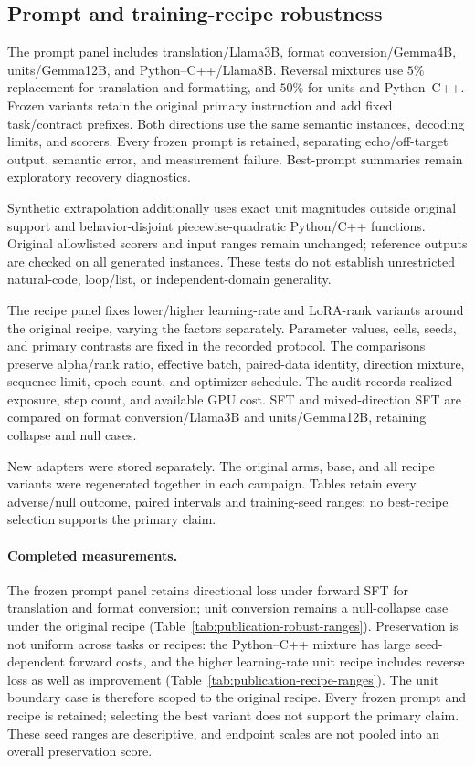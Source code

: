 \subsection{Prompt and training-recipe robustness}
\label{app:robustness}

The prompt panel includes translation/Llama3B, format conversion/Gemma4B, units/Gemma12B,
and Python--C++/Llama8B. Reversal mixtures use $5\%$ replacement for translation and
formatting, and $50\%$ for units and Python--C++. Frozen variants retain the original
primary instruction and add fixed task/contract prefixes. Both directions use the same semantic instances, decoding limits,
and scorers. Every frozen prompt is retained, separating echo/off-target output, semantic error,
and measurement failure. Best-prompt summaries remain exploratory recovery diagnostics.

Synthetic extrapolation additionally uses exact unit magnitudes outside original support and
behavior-disjoint piecewise-quadratic Python/C++ functions. Original allowlisted scorers and
input ranges remain unchanged; reference outputs are checked on all generated instances.
These tests do not establish unrestricted natural-code, loop/list, or independent-domain
generality.

The recipe panel fixes lower/higher learning-rate and LoRA-rank variants around the original
recipe, varying the factors separately. Parameter values, cells, seeds, and primary contrasts
are fixed in the recorded protocol. The comparisons preserve alpha/rank ratio, effective batch, paired-data
identity, direction mixture, sequence limit, epoch count, and optimizer schedule. The audit
records realized exposure, step count, and available GPU cost. SFT and mixed-direction SFT are compared on
format conversion/Llama3B and units/Gemma12B, retaining collapse and null cases.

New adapters were stored separately. The original arms, base, and all recipe variants were
regenerated together in each campaign. Tables retain every adverse/null outcome, paired intervals and
training-seed ranges; no best-recipe selection supports the primary claim.
\paragraph{Completed measurements.}
The frozen prompt panel retains directional loss under forward SFT for translation and format
conversion; unit conversion remains a null-collapse case under the original recipe
(Table~\ref{tab:publication-robust-ranges}). Preservation is not uniform across tasks or
recipes: the Python--C++ mixture has large seed-dependent forward costs, and the higher
learning-rate unit recipe includes reverse loss as well as improvement
(Table~\ref{tab:publication-recipe-ranges}). The unit boundary case is therefore scoped to
the original recipe. Every frozen prompt and recipe is retained; selecting the best variant
does not support the primary claim. These seed ranges are descriptive, and endpoint scales
are not pooled into an overall preservation score.

